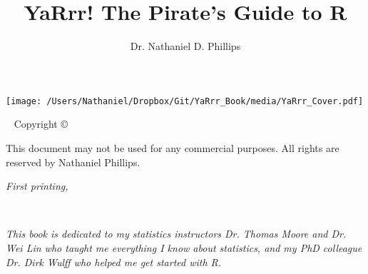 \documentclass{tufte-book}\usepackage[]{graphicx}\usepackage[]{color}
\title{YaRrr! The Pirate's Guide to R}
\author{Dr. Nathaniel D. Phillips}
\begin{document}
\begin{center}
\texttt{[image: /Users/Nathaniel/Dropbox/Git/YaRrr\_Book/media/YaRrr\_Cover.pdf]}
\end{center}



\frontmatter

\maketitle


\newpage
\begin{fullwidth}
~\vfill
\thispagestyle{empty}
\setlength{\parindent}{0pt}
\setlength{\parskip}{\baselineskip}
Copyright \copyright\ \the\year\ \thanklessauthor

\par{}

\par{}

\par This document may not be used for any commercial purposes. All rights are reserved by Nathaniel Phillips.

\par\textit{First printing, \monthyear}
\end{fullwidth}


\tableofcontents %






\cleardoublepage
~\vfill
\begin{doublespace}
\noindent\fontsize{18}{22}\selectfont\itshape
\nohyphenation
This book is dedicated to my statistics instructors Dr. Thomas Moore and Dr. Wei Lin who taught me everything I know about statistics, and my PhD colleague Dr. Dirk Wulff who helped me get started with R.
\end{doublespace}
\vfill
% 
% 
% 
% 
% 
\end{document}
